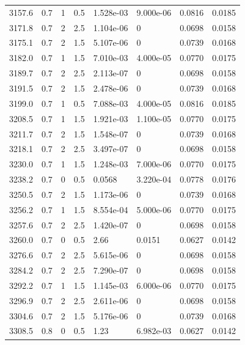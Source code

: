 \documentclass[preview]{standalone}
\begin{document}
{{{{{{{{\begin{tabular}{L{1.2cm}C{1.2cm} C{0.3cm}C{0.5cm} C{1.4cm}C{1.4cm} C{1.4cm}C{1.4cm}}
  3157.6  &   0.7  & 1     & 0.5 &  1.528e-03  & 9.000e-06  & 0.0816 &  0.0185   \\ 
  3171.8  &   0.7  & 2     & 2.5 &  1.104e-06  & 0  & 0.0698 &  0.0158   \\ 
  3175.1  &   0.7  & 2     & 1.5 &  5.107e-06  & 0  & 0.0739 &  0.0168   \\ 
  3182.0  &   0.7  & 1     & 1.5 &  7.010e-03  & 4.000e-05  & 0.0770 &  0.0175   \\ 
  3189.7  &   0.7  & 2     & 2.5 &  2.113e-07  & 0  & 0.0698 &  0.0158   \\ 
  3191.5  &   0.7  & 2     & 1.5 &  2.478e-06  & 0  & 0.0739 &  0.0168   \\ 
  3199.0  &   0.7  & 1     & 0.5 &  7.088e-03  & 4.000e-05  & 0.0816 &  0.0185   \\ 
  3208.5  &   0.7  & 1     & 1.5 &  1.921e-03  & 1.100e-05  & 0.0770 &  0.0175   \\ 
  3211.7  &   0.7  & 2     & 1.5 &  1.548e-07  & 0  & 0.0739 &  0.0168   \\ 
  3218.1  &   0.7  & 2     & 2.5 &  3.497e-07  & 0  & 0.0698 &  0.0158   \\ 
  3230.0  &   0.7  & 1     & 1.5 &  1.248e-03  & 7.000e-06  & 0.0770 &  0.0175   \\ 
  3238.2  &   0.7  & 0     & 0.5 &  0.0568  & 3.220e-04  & 0.0778 &  0.0176   \\ 
  3250.5  &   0.7  & 2     & 1.5 &  1.173e-06  & 0  & 0.0739 &  0.0168   \\ 
  3256.2  &   0.7  & 1     & 1.5 &  8.554e-04  & 5.000e-06  & 0.0770 &  0.0175   \\ 
  3257.6  &   0.7  & 2     & 2.5 &  1.420e-07  & 0  & 0.0698 &  0.0158   \\ 
  3260.0  &   0.7  & 0     & 0.5 &  2.66  & 0.0151  & 0.0627 &  0.0142   \\ 
  3276.6  &   0.7  & 2     & 2.5 &  5.615e-06  & 0  & 0.0698 &  0.0158   \\ 
  3284.2  &   0.7  & 2     & 2.5 &  7.290e-07  & 0  & 0.0698 &  0.0158   \\ 
  3292.2  &   0.7  & 1     & 1.5 &  1.145e-03  & 6.000e-06  & 0.0770 &  0.0175   \\ 
  3296.9  &   0.7  & 2     & 2.5 &  2.611e-06  & 0  & 0.0698 &  0.0158   \\ 
  3304.6  &   0.7  & 2     & 1.5 &  5.176e-06  & 0  & 0.0739 &  0.0168   \\ 
  3308.5  &   0.8  & 0     & 0.5 &  1.23  & 6.982e-03  & 0.0627 &  0.0142   \\ 

\end{tabular}}}}}}}}}
\end{document}
